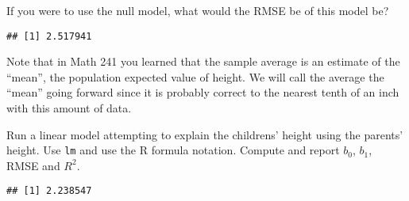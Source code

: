 \documentclass[
]{article}
\newenvironment{Shaded}{\begin{snugshade}}{\end{snugshade}}
\newcommand{\DecValTok}[1]{\textcolor[rgb]{0.00,0.00,0.81}{#1}}
\newcommand{\FunctionTok}[1]{\textcolor[rgb]{0.00,0.00,0.00}{#1}}
\newcommand{\NormalTok}[1]{#1}
\newcommand{\OtherTok}[1]{\textcolor[rgb]{0.56,0.35,0.01}{#1}}
\newcommand{\SpecialCharTok}[1]{\textcolor[rgb]{0.00,0.00,0.00}{#1}}
\begin{document}
If you were to use the null model, what would the RMSE be of this model
be?

\begin{Shaded}
\end{Shaded}

\begin{verbatim}
## [1] 2.517941
\end{verbatim}

Note that in Math 241 you learned that the sample average is an estimate
of the ``mean'', the population expected value of height. We will call
the average the ``mean'' going forward since it is probably correct to
the nearest tenth of an inch with this amount of data.

Run a linear model attempting to explain the childrens' height using the
parents' height. Use \texttt{lm} and use the R formula notation. Compute
and report \(b_0\), \(b_1\), RMSE and \(R^2\).

\begin{Shaded}
\end{Shaded}

\begin{verbatim}
## [1] 2.238547
\end{verbatim}

\begin{Shaded}
\end{Shaded}
\end{document}
